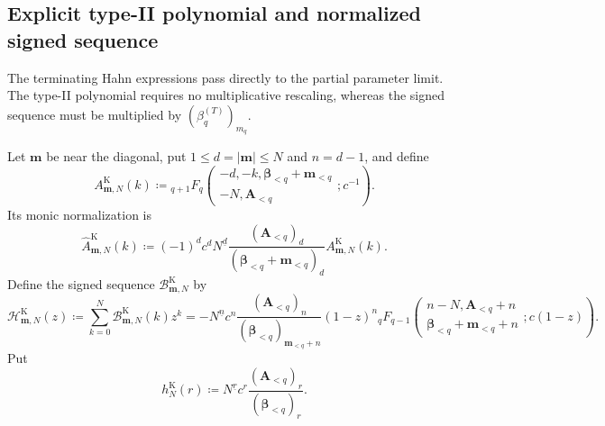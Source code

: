 \documentclass[10pt]{amsart}
\newcommand{\A}{\boldsymbol A}
\newcommand{\bbeta}{\boldsymbol\beta}
\newcommand{\mm}{\boldsymbol m}
\newcommand{\abs}[1]{\lvert#1\rvert}
\newcommand{\fall}[2]{#1^{\underline{#2}}}
\newcommand{\pFq}[5]{{}_{#1}F_{#2}\!\left(\begin{matrix}#3\\#4\end{matrix};#5\right)}
\theoremstyle{plain}
\theoremstyle{definition}
\theoremstyle{remark}
\begin{document}
\subsection{Explicit type-II polynomial and normalized signed sequence}

The terminating Hahn expressions pass directly to the partial parameter
limit. The type-II polynomial requires no multiplicative rescaling,
whereas the signed sequence must be multiplied by
\((\beta_q^{(T)})_{m_q}\).

Let \(\mm\) be near the diagonal, put
\(1\le d=\abs\mm\le N\) and \(n=d-1\), and define
\begin{equation}
 A_{\mm,N}^{\mathrm K}(k)
 \coloneq
 \pFq{q+1}{q}
 {-d,-k,\bbeta_{<q}+\mm_{<q}}
 {-N,\A_{<q}}{c^{-1}}.
 \label{eq:K-A}
\end{equation}
Its monic normalization is
\begin{equation}
 \widehat A_{\mm,N}^{\mathrm K}(k)
 \coloneq
 (-1)^dc^d\fall{N}{d}
 \frac{(\A_{<q})_d}
 {(\bbeta_{<q}+\mm_{<q})_d}
 A_{\mm,N}^{\mathrm K}(k).
 \label{eq:K-monic-A}
\end{equation}
Define the signed sequence \(\mathcal B_{\mm,N}^{\mathrm K}\) by
\begin{equation}
 \mathcal H_{\mm,N}^{\mathrm K}(z)
 \coloneq\sum_{k=0}^N\mathcal B_{\mm,N}^{\mathrm K}(k)z^k
 =-\fall{N}{n}c^n
 \frac{(\A_{<q})_n}{(\bbeta_{<q})_{\mm_{<q}+n}}
 (1-z)^n
 \pFq{q}{q-1}{n-N,\A_{<q}+n}
 {\bbeta_{<q}+\mm_{<q}+n}{c(1-z)}.
 \label{eq:K-B-pgf}
\end{equation}
Put
\begin{equation}
 h_N^{\mathrm K}(r)
 \coloneq
 \fall{N}{r}c^r
 \frac{(\A_{<q})_r}{(\bbeta_{<q})_r}.
 \label{eq:K-h}
\end{equation}
\end{document}
